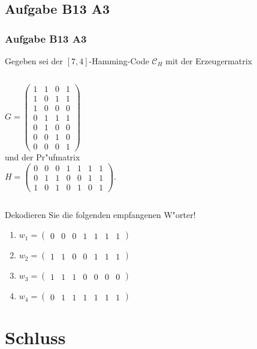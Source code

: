 \subsection{Aufgabe B13 A3}
\begin{frame}
\frametitle{Aufgabe B13 A3}
Gegeben sei der $[7,4]$-Hamming-Code $\mathcal{C}_H$ mit der Erzeugermatrix\\[4pt]
\begin{columns}
$G = \left( \begin{array}{cccc}
1 & 1 & 0 & 1 \\
1 & 0 & 1 & 1 \\
1 & 0 & 0 & 0 \\
0 & 1 & 1 & 1 \\
0 & 1 & 0 & 0 \\
0 & 0 & 1 & 0 \\
0 & 0 & 0 & 1
\end{array} \right)$\\[4pt]
und der Pr"ufmatrix\\[4pt]
$H = \left( \begin{array}{ccccccc}
0 & 0 & 0 & 1 & 1 & 1 & 1 \\
0 & 1 & 1 & 0 & 0 & 1 & 1 \\
1 & 0 & 1 & 0 & 1 & 0 & 1
\end{array} \right)$.\\[4pt]
\end{columns}
\vspace{0.5cm}
Dekodieren Sie die folgenden empfangenen W"orter!
\begin{enumerate}
\item $w_1 = (\begin{array}{ccccccc}0 & 0 & 0 & 1 & 1 & 1 & 1\end{array})$
\item $w_2 = (\begin{array}{ccccccc}1 & 1 & 0 & 0 & 1 & 1 & 1\end{array})$
\item $w_3 = (\begin{array}{ccccccc}1 & 1 & 1 & 0 & 0 & 0 & 0\end{array})$
\item $w_4 = (\begin{array}{ccccccc}0 & 1 & 1 & 1 & 1 & 1 & 1\end{array})$
\end{enumerate}
\end{frame}


\section{Schluss}
